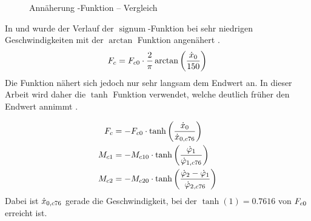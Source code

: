 \begin{figure}[b]
	\caption{Annäherung -Funktion -- Vergleich}
	\label{fig:sign}
\end{figure}

In \cite{chang} und \cite{kisner} wurde der Verlauf der $\operatorname{signum}$-Funktion bei sehr niedrigen Geschwindigkeiten mit der $\arctan$ Funktion angenähert .
	\[
		F_c=F_{c0} \cdot \frac{2}{\pi} \arctan \left(\frac{\dot{x}_0}{150}\right)
\]
Die Funktion nähert sich jedoch nur sehr langsam dem Endwert an.
In dieser Arbeit wird daher die $\tanh$ Funktion verwendet, welche deutlich früher den Endwert annimmt .

\begin{subequations} \begin{align}
	F_c  &= -F_{c0}  \cdot \tanh{\left(\frac{\ensuremath{\dot{x}_0}}{\ensuremath{\dot{x}_{0,c76}}}\right)}  \\
	M_{c1} &= -M_{c10} \cdot \tanh{\left(\frac{\ensuremath{\dot{\varphi}_1}}{\ensuremath{\dot{\varphi}_{1,c76}}}\right)}  \\
	M_{c2} &= -M_{c20} \cdot \tanh{\left(\frac{\ensuremath{\dot{\varphi}_2}-\ensuremath{\dot{\varphi}_1}}{\ensuremath{\dot{\varphi}_{2,c76}}}\right)}
 \end{align} \end{subequations}
Dabei ist $\dot{x}_{0,c76}$ gerade die Geschwindigkeit, bei der $\tanh(1)=0.7616$ von $F_{c0}$ erreicht ist.



